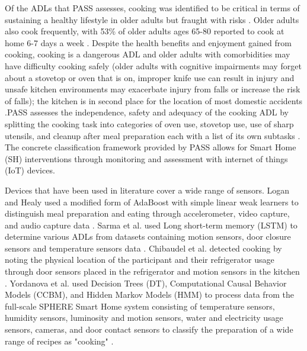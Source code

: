 
Of the ADLs that PASS assesses, cooking was identified to be critical in terms of sustaining a healthy lifestyle in older adults \cite{bouchard_smart_2020} but fraught with risks \cite{yared_cooking_2015}. Older adults also cook frequently, with 53\% of older adults ages 65-80 reported to cook at home 6-7 days a week \cite{malani_joy_2020}. Despite the health benefits and enjoyment gained from cooking, cooking is a dangerous ADL and older adults with comorbidities may have difficulty cooking safely (older adults with cognitive impairments may forget about a stovetop or oven that is on, improper knife use can result in injury and unsafe kitchen environments may exacerbate injury from falls or increase the risk of falls); the kitchen is in second place for the location of most domestic accidents \cite{yared_cooking_2015}.PASS assesses the independence, safety and adequacy of the cooking ADL by splitting the cooking task into categories of oven use, stovetop use, use of sharp utensils, and cleanup after meal preparation each with a list of its own subtasks \cite{rogers_performance_2014}. The concrete classification framework provided by PASS allows for Smart Home (SH) interventions through monitoring and assessment with internet of things (IoT) devices.

Devices that have been used in literature cover a wide range of sensors. Logan and Healy used a modified form of AdaBoost with simple linear weak learners to distinguish meal preparation and eating through accelerometer, video capture, and audio capture data \cite{logan_sensors_2006}. Sarma et al. used Long short-term memory (LSTM) to determine various ADLs from datasets containing motion sensors, door closure sensors and temperature sensors data \cite{sarma_activity_2019}. Chibaudel et al. detected cooking by noting the physical location of the participant and their refrigerator usage through door sensors placed in the refrigerator and motion sensors in the kitchen \cite{mokhtari_smart_2018}. Yordanova et al. used Decision Trees (DT), Computational Causal Behavior Models (CCBM), and Hidden Markov Models (HMM) to process data from the full-scale SPHERE Smart Home system consisting of temperature sensors, humidity sensors, luminosity and motion sensors, water and electricity usage sensors, cameras, and door contact sensors to classify the preparation of a wide range of recipes as "cooking" \cite{yordanova_analysing_2019}.

